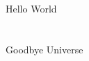 \documentclass[12pt,letterpaper]{article}
\begin{document}
\setcounter{section}{23}
\section{}
Hello World

\section{}
Goodbye Universe
\end{document}
